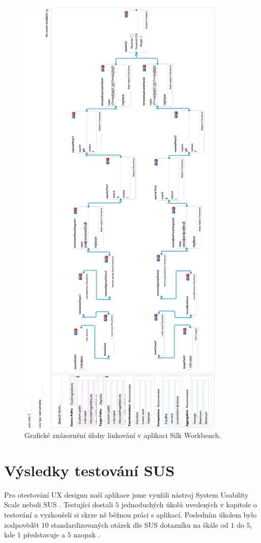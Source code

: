 \documentclass[12pt,a4paper]{report}
\begin{document}
\begin{figure}[h!]\centering
\includegraphics[height=220mm]{../img/silk-workbench}
\caption{Grafické znázornění úlohy linkování v aplikaci Silk Workbench.}
\label{obr0a:silk-workbench}
\end{figure}

\section{Výsledky testování SUS}

Pro otestování UX designu naší aplikace jsme využili nástroj System Usability Scale neboli SUS \citep{sus-test}. Testující dostali $5$ jednoduchých úkolů uvedených v kapitole o testování a vyzkoušeli si skrze ně běžnou práci s aplikací. Posledním úkolem bylo zodpovědět $10$ standardizovaných otázek dle SUS dotazníku na škále od $1$ do $5$, kde $1$ představuje  a $5$ naopak . 
\end{document}
